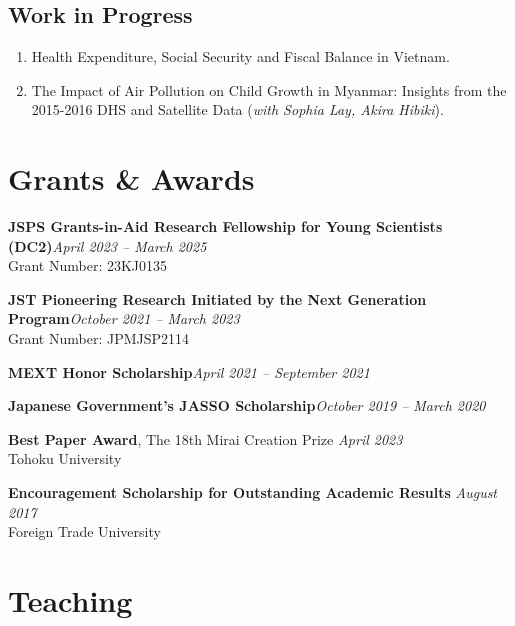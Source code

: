 \documentclass[12pt]{article}
\begin{document}
\subsection{Work in Progress}

\begin{enumerate}[resume*] 

\item Health Expenditure, Social Security and Fiscal Balance in Vietnam.

\item The Impact of Air Pollution on Child Growth in Myanmar: Insights from the 2015-2016 DHS and Satellite Data (\textit{with Sophia Lay, Akira Hibiki}).

\end{enumerate}


\section{Grants \& Awards}

\textbf{JSPS Grants-in-Aid Research Fellowship for Young Scientists (DC2)}\hfill \emph{April 2023 -- March 2025}\\
Grant Number: 23KJ0135

\textbf{JST Pioneering Research Initiated by the Next Generation Program}\hfill \emph{October 2021 -- March 2023}\\
Grant Number: JPMJSP2114

\textbf{MEXT Honor Scholarship}\hfill \emph{April 2021 -- September 2021}

\textbf{Japanese Government's JASSO Scholarship}\hfill \emph{October 2019 -- March 2020}

\textbf{Best Paper Award}, The 18th Mirai Creation Prize \hfill \emph{April 2023}\\
Tohoku University

\textbf{Encouragement Scholarship for Outstanding Academic Results} \hfill \emph{August 2017}\\
Foreign Trade University


\section{Teaching}
\end{document}
